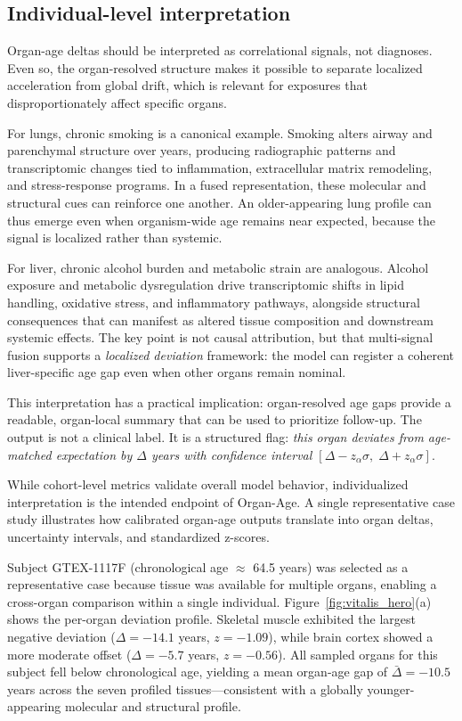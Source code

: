 \documentclass[10pt,twocolumn]{article}
\begin{document}
\subsection{Individual-level interpretation}

Organ-age deltas should be interpreted as correlational signals, not diagnoses. Even so, the
organ-resolved structure makes it possible to separate localized acceleration from global drift,
which is relevant for exposures that disproportionately affect specific organs.

For lungs, chronic smoking is a canonical example. Smoking alters airway and parenchymal structure
over years, producing radiographic patterns and transcriptomic changes tied to inflammation,
extracellular matrix remodeling, and stress-response programs. In a fused representation, these
molecular and structural cues can reinforce one another. An older-appearing lung profile can thus
emerge even when organism-wide age remains near expected, because the signal is localized rather
than systemic.

For liver, chronic alcohol burden and metabolic strain are analogous. Alcohol exposure and
metabolic dysregulation drive transcriptomic shifts in lipid handling, oxidative stress, and
inflammatory pathways, alongside structural consequences that can manifest as altered tissue
composition and downstream systemic effects. The key point is not causal attribution, but that
multi-signal fusion supports a \emph{localized deviation} framework: the model can register a
coherent liver-specific age gap even when other organs remain nominal.

This interpretation has a practical implication: organ-resolved age gaps provide a readable,
organ-local summary that can be used to prioritize follow-up. The output is not a clinical label.
It is a structured flag: \emph{this organ deviates from age-matched expectation by $\Delta$ years
with confidence interval $[\Delta - z_{\alpha}\sigma, \; \Delta + z_{\alpha}\sigma]$}.

While cohort-level metrics validate overall model behavior, individualized interpretation is the
intended endpoint of Organ-Age. A single representative case study illustrates how calibrated
organ-age outputs translate into organ deltas, uncertainty intervals, and standardized z-scores.

Subject GTEX-1117F (chronological age $\approx$ 64.5 years) was selected as a representative
case because tissue was available for multiple organs, enabling a cross-organ comparison within
a single individual. Figure~\ref{fig:vitalis_hero}(a) shows the per-organ deviation profile.
Skeletal muscle exhibited the largest negative deviation ($\Delta = -14.1$ years, $z = -1.09$),
while brain cortex showed a more moderate offset ($\Delta = -5.7$ years, $z = -0.56$). All
sampled organs for this subject fell below chronological age, yielding a mean organ-age gap of
$\bar{\Delta} = -10.5$ years across the seven profiled tissues---consistent with a globally
younger-appearing molecular and structural profile.
\end{document}
